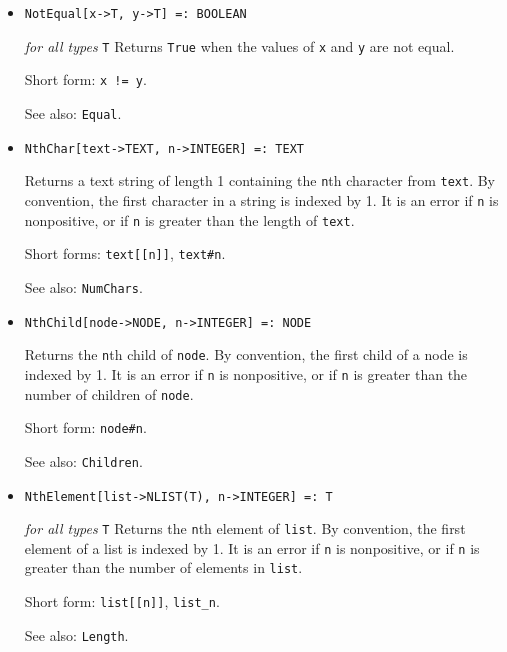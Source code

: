 \begin{itemize}
\item
\protect \large \begin{verbatim}
NotEqual[x->T, y->T] =: BOOLEAN
\end{verbatim}\normalsize

{\it for all types} {\tt T}
\bd
Returns \verb+True+ when the values of \verb+x+ and \verb+y+ are
not equal.
\item [Short form:] \verb+x != y+.
\item [See also:] \verb+Equal+.
\ed

\item
\protect \large \begin{verbatim}
NthChar[text->TEXT, n->INTEGER] =: TEXT
\end{verbatim}\normalsize

\bd
Returns a text string of length 1 containing the \verb+n+th
character from \verb+text+.  By convention, the first character
in a string is indexed by 1.  It is an error if \verb+n+ is nonpositive,
or if \verb+n+ is greater than the length of \verb+text+.
\item [Short forms:] \verb+text[[n]]+, \verb+text#n+.
\item [See also:] \verb+NumChars+.
\ed

\item
\protect \large \begin{verbatim} 
NthChild[node->NODE, n->INTEGER] =: NODE
\end{verbatim}\normalsize

\bd
Returns the \verb+n+th child of \verb+node+.
By convention, the first child of a node is indexed by 1.
It is an error if \verb+n+ is nonpositive, or if \verb+n+ is greater
than the number of children of \verb+node+.
\item [Short form:] \verb+node#n+.
\item [See also:] \verb+Children+.
\ed

\item
\protect \large \begin{verbatim}
NthElement[list->NLIST(T), n->INTEGER] =: T 
\end{verbatim}\normalsize

{\it for all types} {\tt T}
\bd
Returns the \verb+n+th element of \verb+list+.
By convention, the first element of a list is indexed by 1.
It is an error if \verb+n+ is nonpositive, or if \verb+n+ is greater
than the number of elements in \verb+list+.
\item [Short form:] \verb+list[[n]]+, \verb+list_n+.
\item [See also:] \verb+Length+.
\ed


\end{itemize}
